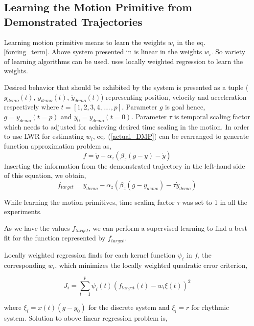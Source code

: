 \subsection{Learning the Motion Primitive from Demonstrated Trajectories}
\par Learning motion primitive means to learn the weights $w_{i}$ in the eq. \ref{forcing_term}. Above system presented in \cite{ijspeert2013dynamical} is linear in the weights $w_{i}$. So variety of learning algorithms can be used. \cite{ijspeert2013dynamical} uses locally weighted regression to learn the weights. 

Desired behavior that should be exhibited by the system is presented as a tuple ($y_{demo}(t)$, $\dot{y}_{demo}(t)$, $\ddot{y}_{demo}(t)$) representing position, velocity and acceleration respectively where $t = [1,2,3,4,....,p]$. Parameter $g$ is goal hence, $g = y_{demo}(t = p)$ and $y_{0} = y_{demo}(t = 0)$. Parameter $\tau$ is temporal scaling factor which needs to adjusted for achieving desired time scaling in the motion. In order to use LWR for estimating $w_{i}$, eq. (\ref{actual_DMP}) can be rearranged to generate function approximation problem as,
\begin{equation}
f = \ddot{y} - \alpha_{z}(\beta_{z}(g - y) - \dot{y})
\end{equation}
Inserting the information from the demonstrated trajectory in the left-hand side of this equation, we obtain,
\begin{equation}
f_{target} = \ddot{y}_{demo} - \alpha_{z}(\beta_{z}(g - y_{demo}) - \tau\dot{y}_{demo})
\end{equation}

While learning the motion primitives, time scaling factor $\tau$ was set to 1 in all the experiments. 

As we have the values $f_{target}$, we can perform a supervised learning to find a best fit for the function represented by $f_{target}$. 

Locally weighted regression finds for each kernel function $\psi_{i}$ in $f$, the
corresponding $w_{i}$, which minimizes the locally weighted quadratic error criterion,

\begin{equation}
	J_{i} = \sum_{t=1}^{p}\psi_{i}(t)(f_{target}(t)-w_{i}\xi(t))^{2}
\end{equation}

where $\xi_{i} = x(t)(g-y_{0})$ for the discrete system and $\xi_{i} = r$ for rhythmic system. Solution to above linear regression problem is,

